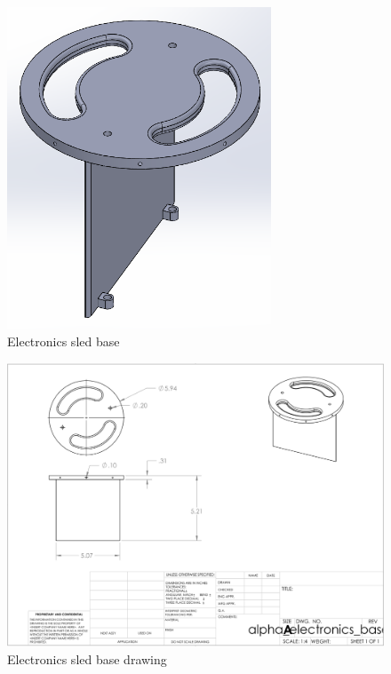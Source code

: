 \begin{figure}[H]
    \centering
    \includegraphics[width=0.7\textwidth]{src/figs/electronics_sled_base.png}
    \caption{Electronics sled base}
    \label{cad:electronics-sled-base}
\end{figure}

\begin{figure}[H]
    \centering
    \includegraphics[width=\textwidth]{src/figs/cad-and-dwgs/electronics_base_dwg.png}
    \caption{Electronics sled base drawing}
    \label{cad:electronics-sled-base:dwg}
\end{figure}

